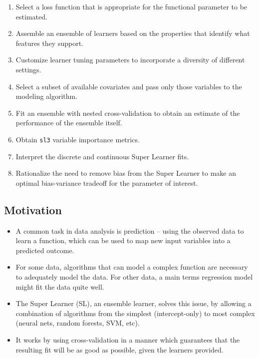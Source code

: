 \documentclass[12pt, krantz2,]{krantz}
\providecommand{\tightlist}{%
  \setlength{\itemsep}{0pt}\setlength{\parskip}{0pt}}
\theoremstyle{definition}
\theoremstyle{definition}
\theoremstyle{definition}
\newcommand{\1}{\mathbbm{1}}
\begin{document}
\begin{enumerate}
\def\labelenumi{\arabic{enumi}.}
\tightlist
\item
  Select a loss function that is appropriate for the functional parameter to
  be estimated.
\item
  Assemble an ensemble of learners based on the properties that identify what
  features they support.
\item
  Customize learner tuning parameters to incorporate a diversity of different
  settings.
\item
  Select a subset of available covariates and pass only those variables to the
  modeling algorithm.
\item
  Fit an ensemble with nested cross-validation to obtain an estimate of the
  performance of the ensemble itself.
\item
  Obtain \texttt{sl3} variable importance metrics.
\item
  Interpret the discrete and continuous Super Learner fits.
\item
  Rationalize the need to remove bias from the Super Learner to make an
  optimal bias-variance tradeoff for the parameter of interest.
\end{enumerate}

\hypertarget{motivation}{%
\subsection*{Motivation}\label{motivation}}


\begin{itemize}
\tightlist
\item
  A common task in data analysis is prediction -- using the observed data to
  learn a function, which can be used to map new input variables into a
  predicted outcome.
\item
  For some data, algorithms that can model a complex function are necessary to
  adequately model the data. For other data, a main terms regression model might
  fit the data quite well.
\item
  The Super Learner (SL), an ensemble learner, solves this issue, by allowing a
  combination of algorithms from the simplest (intercept-only) to most complex
  (neural nets, random forests, SVM, etc).
\item
  It works by using cross-validation in a manner which guarantees that the
  resulting fit will be as good as possible, given the learners provided.
\end{itemize}
\end{document}
